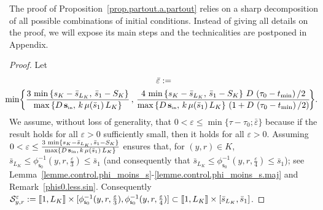 \documentclass[10pt]{amsart}
\theoremstyle{definition}\newtheorem{defi}[theo]{Definition}\newtheorem{rema}[theo]{Remark}\newtheorem{exam}[theo]{Example}\newtheorem{exem}[theo]{Example}\newtheorem{nota}[theo]{Notation}
\newcommand{\llbracket}{\mathopen{[\mkern -2.7mu[}}
\newcommand{\rrbracket}{\mathclose{]\mkern -2.7mu]}}
\newcommand{\clS}{\mathcal{S}}
\newcommand{\Sin}{{\mathbf s}_{\textrm{\tiny\rm in}}}
\newcommand{\SminK}{s_K}
\newcommand{\SmaxK}{S_K}
\newcommand{\barmu}{\mu(\bar s_1)}
\newcommand{\phis}{\phi_{\textsf{s}_0}^{-1}}
\newcommand{\lmax}{{L_K}}
\newcommand{\setunlmax}{\llbracket 1, \lmax\rrbracket}
\newcommand{\1}{\mathbf{1}}
\begin{document}
The proof of Proposition~\ref{prop.partout.a.partout} relies on a sharp decomposition of all possible combinations of initial conditions. Instead of giving all details on the proof, we will expose its main steps and the technicalities are postponed in Appendix.
\begin{proof}
Let
\begin{multline*}
\bar \varepsilon:=\\
\mkern-10mu\min\!\left\{
\frac{3\,\min\left\{\SminK-\bar s_{\lmax},\, \bar s_1-\SmaxK\right\}} {\max\left\{D\,\Sin,\, k\,\barmu\,\lmax\right\}} \,, \,
\frac{4\,\min\left\{\SminK-\bar s_{\lmax},\,\bar s_1-\SmaxK\right\}\,D\,\left(\tau_0-t_{\min}\right)/2} {\max\left\{D\,\Sin,\, k\,\barmu\,\lmax\right\}\,\left(1+D\,\left(\tau_0-t_{\min}\right)/2\right)}\!\right\}\!.
\end{multline*}
We assume, without loss of generality, that $0<\varepsilon\leq \min\{\tau-\tau_0; \bar \varepsilon\}$ because if the result holds for all $\varepsilon>0$ sufficiently small, then it holds for all $\varepsilon>0$. Assuming $0<\varepsilon\leq \frac{3\,\min\{\SminK-\bar s_{\lmax},\, \bar s_1-\SmaxK\}}{\max\{D\,\Sin,\, k\,\barmu\,\lmax\}}$ ensures that, for $(y,r)\in K$, $\bar s_{\lmax}\leq \phis(y,r,\frac{\varepsilon}{3})\leq\bar s_1$ (and consequently that $\bar s_{\lmax}\leq \phis(y,r,\frac{\varepsilon}{4})\leq\bar s_1$); see Lemma~\ref{lemme.control.phi_moins_s}-\ref{lemme.control.phi_moins_s.maj} and Remark~\ref{phis0.less.sin}. Consequently $\clS_{y,r}^\varepsilon:=\setunlmax \times [\phis(y,r,\frac{\varepsilon}{3}), \phis(y,r,\frac{\varepsilon}{4})] \subset \setunlmax \times [\bar s_{\lmax}, \bar s_1]$.




\end{proof}
\end{document}
